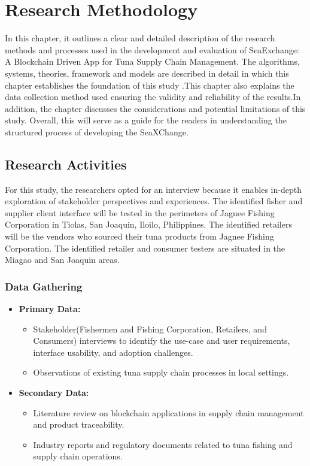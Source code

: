 \chapter{Research Methodology}
In this chapter, it outlines a clear and detailed description of the research methods and processes used in the development and evaluation of SeaExchange: A Blockchain Driven App for Tuna Supply Chain Management. The algorithms, systems, theories, framework and models are described in detail in which this chapter establishes the foundation of this study .This chapter also explains the data collection method used ensuring the validity and reliability of the results.In addition, the chapter discusses the considerations and potential limitations of this study. Overall, this will serve as a guide for the readers in understanding the structured process of developing the SeaXChange.

\section{Research Activities}
For this study, the researchers opted for an interview because it enables in-depth exploration of stakeholder perspectives and experiences. 
The identified fisher and supplier client interface will be tested in the perimeters of Jagnee Fishing Corporation in Tiolas, San Joaquin, Iloilo, Philippines. The identified retailers will be the vendors who sourced their tuna products from Jagnee Fishing Corporation. The identified retailer and consumer testers are situated in the Miagao and San Joaquin areas. 

\subsection{Data Gathering}

\begin{itemize}
	\item \textbf{Primary Data:} 
	\begin{itemize}
		\item Stakeholder(Fishermen and Fishing Corporation, Retailers, and Consumers) interviews to identify the use-case and user requirements, interface usability, and adoption challenges.
		\item Observations of existing tuna supply chain processes in local settings.
	\end{itemize}
	\item \textbf{Secondary Data:} 
	\begin{itemize}
		\item Literature review on blockchain applications in supply chain management and product traceability.
		\item Industry reports and regulatory documents related to tuna fishing and supply chain operations.
	\end{itemize}
\end{itemize}

